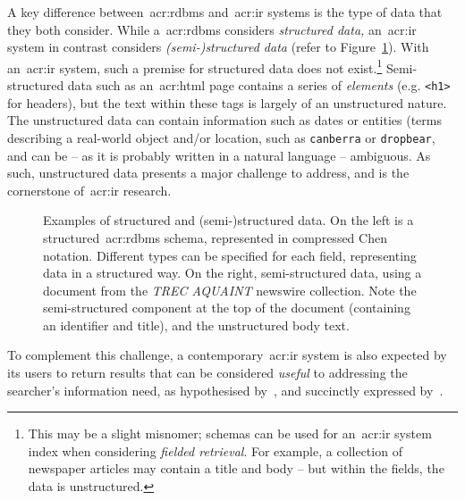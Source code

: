 A key difference between~\gls{acr:rdbms} and~\gls{acr:ir} systems is the type of data that they both consider. While  a~\gls{acr:rdbms} considers \emph{structured data,} an~\gls{acr:ir} system in contrast considers \emph{(semi-)structured data} (refer to Figure~\ref{fig:structured_data}). With an~\gls{acr:ir} system, such a premise for structured data does not exist.\footnote{This may be a slight misnomer; schemas can be used for an~\gls{acr:ir} system index when considering \emph{fielded retrieval}. For example, a collection of newspaper articles may contain a title and body -- but within the fields, the data is unstructured.} Semi-structured data such as an~\gls{acr:html} page contains a series of \emph{elements} (e.g. \texttt{<h1>} for headers), but the text within these tags is largely of an unstructured nature. The unstructured data can contain information such as dates or entities (terms describing a real-world object and/or location, such as \texttt{canberra} or \texttt{dropbear}, and can be -- as it is probably written in a natural language -- ambiguous. As such, unstructured data presents a major challenge to address, and is the cornerstone of~\gls{acr:ir} research.

\begin{figure}[t!]
    \centering
    \caption[Structured and (semi-)structured data]{Examples of structured and (semi-)structured data. On the left is a structured~\gls{acr:rdbms} schema, represented in compressed Chen notation. Different types can be specified for each field, representing data in a structured way. On the right, semi-structured data, using a document from the \emph{TREC AQUAINT} newswire collection. Note the semi-structured component at the top of the document (containing an identifier and title), and the unstructured body text.}
    \label{fig:structured_data}
\end{figure}

To complement this challenge, a contemporary~\gls{acr:ir} system is also expected by its users to return results that can be considered \emph{useful} to addressing the searcher's information need, as hypothesised by~\cite{luhn1957ranking_query}, and succinctly expressed by~\cite{robertson1977prp}.


